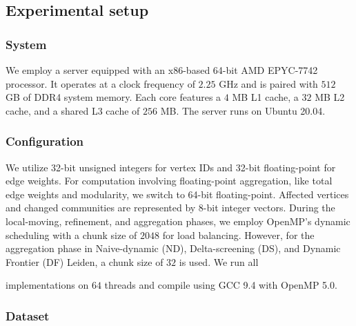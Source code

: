 \subsection{Experimental setup}
\label{sec:setup}

\subsubsection{System}
\label{sec:system}

We employ a server equipped with an x86-based 64-bit AMD EPYC-7742 processor. It operates at a clock frequency of $2.25$ GHz and is paired with $512$ GB of DDR4 system memory. Each core features a $4$ MB L1 cache, a $32$ MB L2 cache, and a shared L3 cache of $256$ MB. The server runs on Ubuntu 20.04.


\subsubsection{Configuration}
\label{sec:configuration}




We utilize 32-bit unsigned integers for vertex IDs and 32-bit floating-point for edge weights. For computation involving floating-point aggregation, like total edge weights and modularity, we switch to 64-bit floating-point. Affected vertices and changed communities are represented by 8-bit integer vectors. During the local-moving, refinement, and aggregation phases, we employ OpenMP's dynamic scheduling with a chunk size of $2048$ for load balancing. However, for the aggregation phase in Naive-dynamic (ND), Delta-screening (DS), and Dynamic Frontier (DF) Leiden, a chunk size of $32$ is used. We run all implementations on $64$ threads and compile using GCC 9.4 with OpenMP 5.0.

\subsubsection{Dataset}
\label{sec:dataset}

